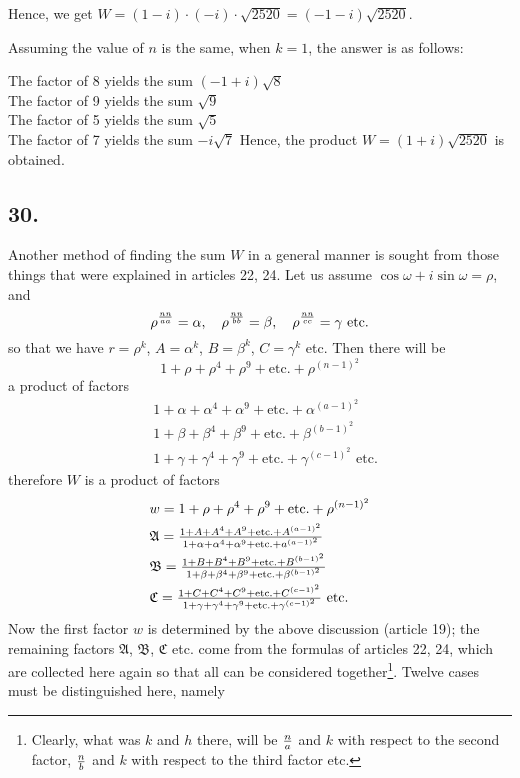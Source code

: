 \documentclass[twoside,12pt, showframe]{memoir}
\renewenvironment{quote}%
  {\list{}{\leftmargin=5em\rightmargin=0em}\item[]}%
  {\endlist}
\let\oldfrac\frac
\def\frac#1#2{\mathchoice{\tfrac{#1}{#2}}{\oldfrac{#1}{#2}}{\genfrac{}{}{}{2}{#1}{#2\mathstrut}}{\genfrac{}{}{}{3}{#1}{#2\mathstrut}}}
\begin{document}
Hence, we get \(W=(1-i) \cdot(-i) \cdot \sqrt{2520}=(-1-i) \sqrt{2520}\).
%

Assuming the value of \( n \) is the same, when \( k = 1 \), the answer is as follows:
\begin{quote}
The factor of 8 yields the sum \((-1+i) \sqrt{8}\)\\
The factor of 9 yields the sum \(\sqrt{9}\)\\
The factor of 5 yields the sum \(\sqrt{5}\)\\
The factor of 7 yields the sum \(-i \sqrt{7}\)
\end{quote}
Hence, the product \(W = (1+i) \sqrt{2520}\) is obtained.
%

\subsection*{30.}
 
Another method of finding the sum \(W\) in a general manner is sought from those things that were explained in articles 22, 24. Let us assume \(\cos \omega+i \sin \omega=\rho\), and
\[\rho^{\frac{n n}{a a}}=\alpha, \quad \rho^{\frac{n n}{b b}}=\beta, \quad \rho^{\frac{n n}{c c}}=\gamma \text{ etc.}\]
so that we have \(r=\rho^{k}\), \(A=\alpha^{k}\), \(B=\beta^{k}\), \(C=\gamma^{k}\) etc. Then there will be
\[1+\rho+\rho^{4}+\rho^{9}+\text{etc.}+\rho^{(n-1)^{2}}\]
a product of factors
\[\begin{aligned}
& 1+\alpha+\alpha^{4}+\alpha^{9}+\text{etc.}+\alpha^{(a-1)^{2}} \\
& 1+\beta+\beta^{4}+\beta^{9}+\text{etc.}+\beta^{(b-1)^{2}} \\
& 1+\gamma+\gamma^{4}+\gamma^{9}+\text{etc.}+\gamma^{(c-1)^{2}} \text{ etc.}
\end{aligned}\]\clearpage\noindent%
therefore \(W\) is a product of factors
\[\begin{aligned}
& w=1+\rho+\rho^{4}+\rho^{9}+\text{etc.}+\rho^{(n-1)^{2}} \\
& \mathfrak{A}=\frac{1+A+A^{4}+A^{9}+\text{etc.}+A^{(a-1)^{2}}}{1+\alpha+\alpha^{4}+\alpha^{9}+\text{etc.}+a^{(a-1)^{2}}} \\
& \mathfrak{B}=\frac{1+B+B^{4}+B^{9}+\text{etc.}+B^{(b-1)^{2}}}{1+\beta+\beta^{4}+\beta^{9}+\text{etc.}+\beta^{(b-1)^2}} \\
& \mathfrak{C}=\frac{1+C+C^{4}+C^{9}+\text{etc.}+C^{(c-1)^{2}}}{1+\gamma+\gamma^{4}+\gamma^{9}+\text{etc.}+\gamma^{(c-1)^{2}}} \text{ etc.}
\end{aligned}\]
Now the first factor \(w\) is determined by the above discussion (article 19); the remaining factors \(\mathfrak{A}\), \(\mathfrak{B}\), \(\mathfrak{C}\) etc. come from the formulas of articles 22, 24, which are collected here again so that all can be considered together\footnote{Clearly, what was \(k\) and \(h\) there, will be \(\frac{n}{a}\) and \(k\) with respect to the second factor, \(\frac{n}{b}\) and \(k\) with respect to the third factor etc.}. Twelve cases must be distinguished here, namely\\
 
\end{document}
